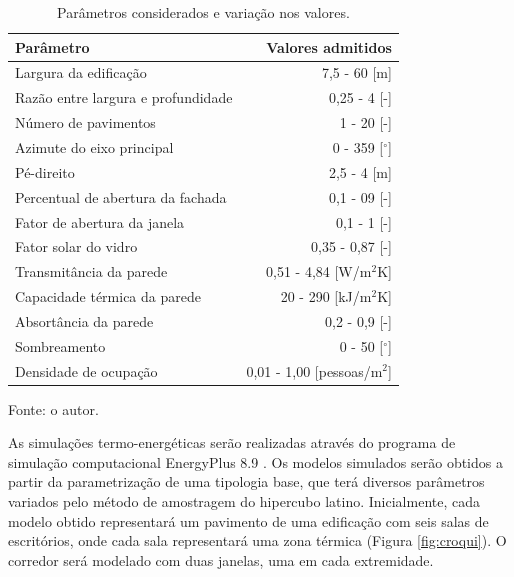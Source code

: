 \documentclass[brazil,hardcopy,openany,a5paper]{ufscthesis}
\begin{document}
		\begin{table}[h]
			\centering
			\caption{Parâmetros considerados e variação nos valores.}
			\label{table:parametros}
			\begin{tabular}{|l |r |}
				\hline
				\textbf{Parâmetro} & \textbf{Valores admitidos} \\
				\hline
				Largura da edificação & 7,5 - 60 [m] \\
				\hline
				Razão entre largura e profundidade & 0,25 - 4 [-] \\
				\hline
				Número de pavimentos & 1 - 20 [-] \\
				\hline 
				Azimute do eixo principal & 0 - 359 [$^{\circ}$] \\
				\hline 
				Pé-direito & 2,5 - 4 [m] \\
				\hline 
				Percentual de abertura da fachada & 0,1 - 09 [-] \\
				\hline 
				Fator de abertura da janela & 0,1 - 1 [-] \\
				\hline 
				Fator solar do vidro & 0,35 - 0,87 [-] \\
				\hline 
				Transmitância da parede & 0,51 - 4,84 [W/m$^2$K] \\
				\hline 
				Capacidade térmica da parede & 20 - 290 [kJ/m$^2$K] \\
				\hline 
				Absortância da parede & 0,2 - 0,9 [-] \\
				\hline 
				Sombreamento & 0 - 50 [$^{\circ}$] \\
				\hline 
				Densidade de ocupação & 0,01 - 1,00 [pessoas/m$^2$] \\
				\hline 
			\end{tabular}
			\begin{flushleft}
				Fonte: o autor.
			\end{flushleft}				
		\end{table}

		As simulações termo-energéticas serão realizadas através do programa de simulação computacional EnergyPlus 8.9 \cite{EnergyPlus2018}. Os modelos simulados serão obtidos a partir da parametrização de uma tipologia base, que terá diversos parâmetros variados pelo método de amostragem do hipercubo latino. Inicialmente, cada modelo obtido representará um pavimento de uma edificação com seis salas de escritórios, onde cada sala representará uma zona térmica (Figura \ref{fig:croqui}). O corredor será modelado com duas janelas, uma em cada extremidade.
		
\end{document}
